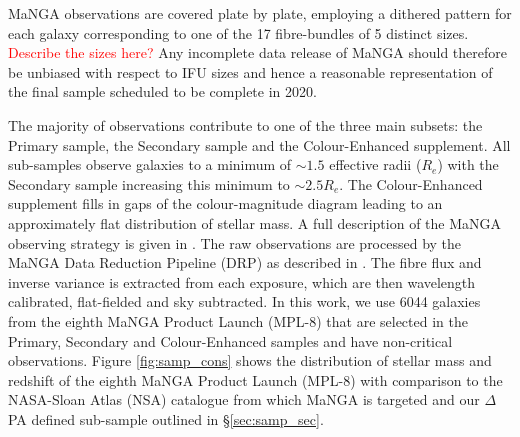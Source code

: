 \documentclass[fleqn,usenatbib]{mnras}
\newcommand{\red}[1]{{\textcolor{red}{#1}}}
\begin{document}
MaNGA observations are covered plate by plate, employing a dithered pattern for each galaxy corresponding to one of the 17 fibre-bundles of 5 distinct sizes. \red{Describe the sizes here?} Any incomplete data release of MaNGA should therefore be unbiased with respect to IFU sizes and hence a reasonable representation of the final sample scheduled to be complete in 2020.

The majority of observations contribute to one of the three main subsets: the Primary sample, the Secondary sample and the Colour-Enhanced supplement. All sub-samples observe galaxies to a minimum of $\sim 1.5$ effective radii ($R_{e}$) with the Secondary sample increasing this minimum to $\sim 2.5 R_{e}$. The Colour-Enhanced supplement fills in gaps of the colour-magnitude diagram leading to an approximately flat distribution of stellar mass. A full description of the MaNGA observing strategy is given in \citet{law2015obs,yan2016obs}. 
The raw observations are processed by the MaNGA Data 
Reduction Pipeline (DRP) as described in \citet{law2016drp, yan2016spec}. The fibre flux and inverse variance is extracted from each exposure, which are then wavelength calibrated, flat-fielded and sky subtracted. In this work, we use 6044 galaxies from the eighth MaNGA Product Launch (MPL-8) that are selected in the Primary, Secondary and Colour-Enhanced samples and have non-critical observations. Figure \ref{fig:samp_cons} shows the distribution of stellar mass and redshift of the eighth MaNGA Product Launch (MPL-8) with comparison to the NASA-Sloan Atlas (NSA) catalogue from which MaNGA is targeted and our $\Delta$PA defined sub-sample outlined in \S\ref{sec:samp_sec}.
\end{document}
